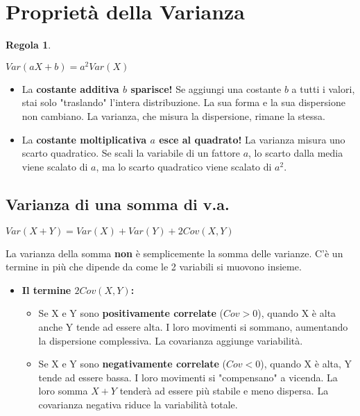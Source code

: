\documentclass[a4paper, 11pt]{article}
\theoremstyle{definition}
\newtheorem{regola}{Regola}[section]
\begin{document}
\section{Proprietà della Varianza}
\begin{regola}
\
\begin{formulabox}
    $Var(aX+b) = a^2 Var(X)$
\end{formulabox}
\begin{itemize}
    \item La \textbf{costante additiva $b$ sparisce!} Se aggiungi una costante $b$ a tutti i valori, stai solo "traslando" l'intera distribuzione. La sua forma e la sua dispersione non cambiano. La varianza, che misura la dispersione, rimane la stessa.
    \item La \textbf{costante moltiplicativa $a$ esce al quadrato!} La varianza misura uno scarto quadratico. Se scali la variabile di un fattore $a$, lo scarto dalla media viene scalato di $a$, ma lo scarto quadratico viene scalato di $a^2$.
\end{itemize}
\end{regola}

\subsection{Varianza di una somma di v.a.}
\begin{formulabox}
    $Var(X+Y) = Var(X) + Var(Y) + 2Cov(X,Y)$
\end{formulabox}
La varianza della somma \textbf{non} è semplicemente la somma delle varianze. C'è un termine in più che dipende da come le 2 variabili si muovono insieme.
\begin{itemize}
    \item \textbf{Il termine $2Cov(X,Y)$:}
    \begin{itemize}
        \item Se X e Y sono \textbf{positivamente correlate} ($Cov > 0$), quando X è alta anche Y tende ad essere alta. I loro movimenti si sommano, aumentando la dispersione complessiva. La covarianza aggiunge variabilità.
        \item Se X e Y sono \textbf{negativamente correlate} ($Cov < 0$), quando X è alta, Y tende ad essere bassa. I loro movimenti si "compensano" a vicenda. La loro somma $X+Y$ tenderà ad essere più stabile e meno dispersa. La covarianza negativa riduce la variabilità totale.
    \end{itemize}
\end{itemize}
\end{document}
